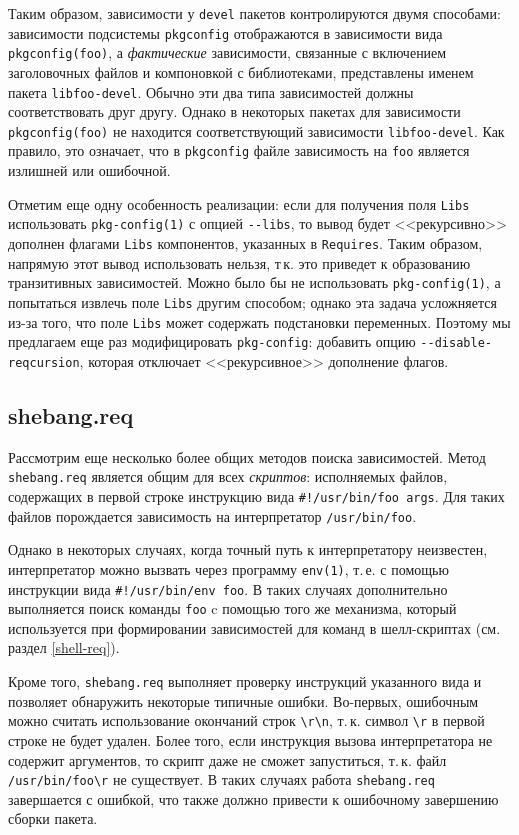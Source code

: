 \documentclass[russian,a4paper,12pt,titlepage]{article}
\begin{document}
Таким образом, зависимости у \verb|devel| пакетов контролируются двумя способами: зависимости подсистемы
\verb|pkgconfig| отображаются в зависимости вида \verb|pkgconfig(foo)|, а \emph{фактические} зависимости,
связанные с включением заголовочных файлов и компоновкой с библиотеками, представлены именем пакета \verb|libfoo-devel|.
Обычно эти два типа зависимостей должны соответствовать друг другу.  Однако в некоторых пакетах для зависимости
\verb|pkgconfig(foo)| не находится соответствующий зависимости \verb|libfoo-devel|.  Как правило, это означает,
что в \verb|pkgconfig| файле зависимость на \verb|foo| является излишней или ошибочной.

Отметим еще одну особенность реализации: если для получения поля \verb|Libs| использовать \verb|pkg-config(1)|
с опцией \verb|--libs|, то вывод будет <<рекурсивно>> дополнен флагами \verb|Libs| компонентов, указанных
в \verb|Requires|.  Таким образом, напрямую этот вывод использовать нельзя, т\,к. это приведет к образованию
транзитивных зависимостей.  Можно было бы не использовать \verb|pkg-config(1)|, а попытаться извлечь поле \verb|Libs|
другим способом; однако эта задача усложняется из-за того, что поле \verb|Libs| может содержать подстановки переменных.
Поэтому мы предлагаем еще раз модифицировать \verb|pkg-config|: добавить опцию \verb|--disable-reqcursion|, которая
отключает <<рекурсивное>> дополнение флагов.

\subsection{shebang.req}
\label{shebang-req}
Рассмотрим еще несколько более общих методов поиска зависимостей.
Метод \verb|shebang.req| является общим для всех \emph{скриптов}: исполняемых файлов, содержащих в первой строке
инструкцию вида \verb|#!/usr/bin/foo args|.  Для таких файлов порождается зависимость на интерпретатор \verb|/usr/bin/foo|.

Однако в некоторых случаях, когда точный путь к интерпретатору неизвестен, интерпретатор можно вызвать через
программу \verb|env(1)|, т.\,е. с помощью инструкции вида \verb|#!/usr/bin/env foo|.  В таких случаях дополнительно
выполняется поиск команды \verb|foo| c помощью того же механизма, который используется при формировании зависимостей
для команд в шелл-скриптах (см. раздел \ref{shell-req}).

Кроме того, \verb|shebang.req| выполняет проверку инструкций указанного вида и позволяет обнаружить некоторые типичные ошибки.
Во-первых, ошибочным можно считать использование окончаний строк \verb|\r\n|, т.\,к. символ \verb|\r| в первой строке
не будет удален.  Более того, если инструкция вызова интерпретатора не содержит аргументов, то скрипт даже не сможет
запуститься, т.\,к. файл \verb|/usr/bin/foo\r| не существует.  В таких случаях работа \verb|shebang.req| завершается с ошибкой,
что также должно привести к ошибочному завершению сборки пакета.
\end{document}
